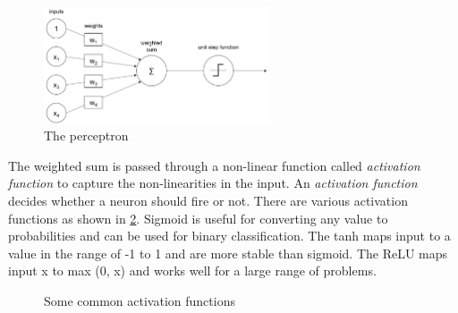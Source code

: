 \documentclass[a4paper, 12pt, oneside, BCOR1cm,toc=chapterentrywithdots]{scrbook}
\begin{document}
\begin{figure}[h]
\centering
\includegraphics[width=0.6\textwidth]{image3.png}
\caption{The perceptron}
\label{fig:pic3}
\end{figure}

 The weighted sum is passed through a non-linear function called \textit{activation function} to capture the non-linearities in the input.  An \textit{activation function} decides whether a neuron should fire or not. There are various activation functions as shown in \ref{fig:act}. Sigmoid is useful for converting any value to probabilities and can be used for binary classification. The tanh maps input to a value in the range of -1 to 1 and are more stable than sigmoid. The ReLU maps input x to max (0, x) and works well for a large range of problems.
 
\begin{figure}[h]
\caption{Some common activation functions}
\label{fig:act}
\end{figure}
\end{document}
